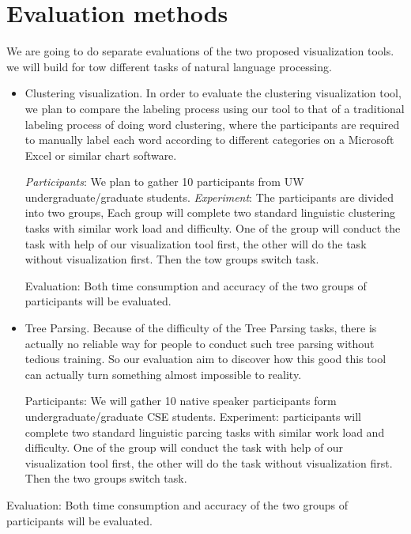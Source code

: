 \section{Evaluation methods}

We are going to do separate evaluations of the two proposed
visualization tools. we will build for tow different tasks of natural
language processing.

\begin{itemize}

\item Clustering visualization. In order to evaluate the clustering
visualization tool, we plan to compare the labeling process using our
tool to that of a traditional labeling
process of doing word clustering, where the participants are required
to manually label each word according to different categories on a
Microsoft Excel or similar chart software.

\textit{Participants}: We plan to gather 10 participants from UW
undergraduate/graduate students.  \textit{Experiment}: The
participants are divided into two groups, Each group will complete two
standard linguistic clustering tasks with similar work load and
difficulty. One of the group will conduct the task with help of our
visualization tool first, the other will do the task without
visualization first. Then the tow groups switch task.

Evaluation: Both time consumption and accuracy of the two groups of
participants will be evaluated.

\item Tree Parsing. Because of the difficulty of the Tree Parsing
tasks, there is actually no reliable way for people to conduct such
tree parsing without tedious training. So our evaluation aim to
discover how this good this tool can actually turn something almost
impossible to reality.

Participants: We will gather 10 native speaker participants form
undergraduate/graduate CSE students.  Experiment: participants will
complete two standard linguistic parcing tasks with similar work load
and difficulty. One of the group will conduct the task with help of
our visualization tool first, the other will do the task without
visualization first. Then the two groups switch task.

\end{itemize}

Evaluation: Both time consumption and accuracy of the two groups of
participants will be evaluated.

